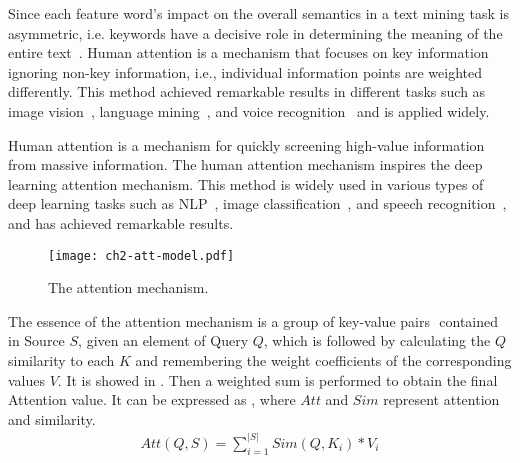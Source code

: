 


Since each feature word's impact on the overall semantics in a text mining task is asymmetric, i.e. keywords have a decisive role in determining the meaning of the entire text~\cite{chaudhari2020attentive}. Human attention is a mechanism that focuses on key information ignoring non-key information, i.e., individual information points are weighted differently. This method achieved remarkable results in different tasks such as image vision~\cite{fu2017look,sun2018multi}, language mining~\cite{hu2019introductory}, and voice recognition~\cite{chorowski2015attention} and is applied widely.


Human attention is a mechanism for quickly screening high-value information from massive information. The human attention mechanism inspires the deep learning attention mechanism. This method is widely used in various types of deep learning tasks such as NLP~\cite{hu2019introductory}, image classification~\cite{fu2017look,sun2018multi}, and speech recognition~\cite{chorowski2015attention}, and has achieved remarkable results.

\begin{figure}[htb]
    \centering
    \texttt{[image: ch2-att-model.pdf]}
    \caption{The attention mechanism.}\label{fig:ch2-model-attmodel}
\end{figure}


The essence of the attention mechanism is a group of key-value pairs \(<K, V>\) contained in Source \(S\), given an element of Query \(Q\), which is followed by calculating the \(Q\) similarity to each \(K\) and remembering the weight coefficients of the corresponding values \(V\). It is showed in \figname{\ref{fig:ch2-model-attmodel}}. Then a weighted sum is performed to obtain the final Attention value. It can be expressed as \eqname{\ref{fml:ch2-attention}}, where \(Att\) and \(Sim\) represent attention and similarity.
\begin{align}\label{fml:ch2-attention}
    Att(Q,S) = \sum_{i=1}^{|S|}Sim(Q,K_i)*V_i
\end{align}

